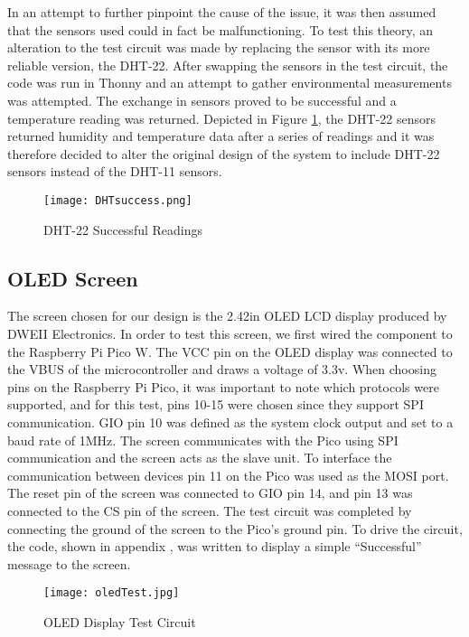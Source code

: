 \documentclass[12pt]{article} %
\begin{document}
In an attempt to further pinpoint the cause of the issue, it was then assumed that the sensors used could in fact be malfunctioning. To test this theory, an alteration to the test circuit was made by replacing the sensor with its more reliable version, the DHT-22. After swapping the sensors in the test circuit, the code was run in Thonny and an attempt to gather environmental measurements was attempted. The exchange in sensors proved to be successful and a temperature reading was returned. Depicted in Figure \ref{fig:DHT-22 Succesful test}, the DHT-22 sensors returned humidity and temperature data after a series of readings and it was therefore decided to alter the original design of the system to include DHT-22 sensors instead of the DHT-11 sensors. 

\begin{figure}[H]
  \centering
  \texttt{[image: DHTsuccess.png]}
  \caption{DHT-22 Successful Readings}
  \label{fig:DHT-22 Succesful test}
\end{figure}

\subsection{OLED Screen}

The screen chosen for our design is the 2.42in OLED LCD display produced by DWEII Electronics. In order to test this screen, we first wired the component to the Raspberry Pi Pico W. The VCC pin on the OLED display was connected to the VBUS of the microcontroller and draws a voltage of 3.3v. When choosing pins on the Raspberry Pi Pico, it was important to note which protocols were supported, and for this test, pins 10-15 were chosen since they support SPI communication. GIO pin 10 was defined as the system clock output and set to a baud rate of 1MHz. The screen communicates with the Pico using SPI communication and the screen acts as the slave unit. To interface the communication between devices pin 11 on the Pico was used as the MOSI port. The reset pin of the screen was connected to GIO pin 14, and pin 13 was connected to the CS pin of the screen. The test circuit was completed by connecting the ground of the screen to the Pico’s ground pin. To drive the circuit, the code, shown in appendix , was written to display a simple “Successful” message to the screen.

\begin{figure}[H]
  \centering
  \texttt{[image: oledTest.jpg]}
  \caption{OLED Display Test Circuit}
  \label{fig:OLED Test}
\end{figure}
\end{document}
